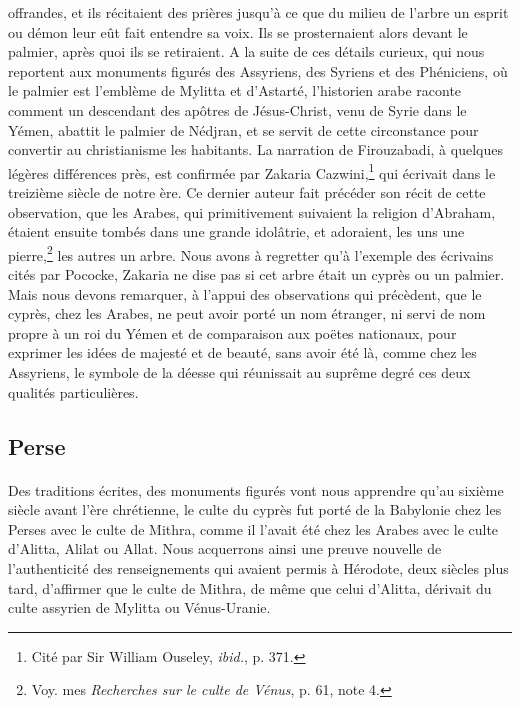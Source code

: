 \documentclass[a4paper, 11pt, oneside, polutonikogreek, french]{article}
\begin{document}
offrandes, et ils récitaient des prières jusqu'à ce que du milieu de l'arbre un esprit ou démon leur eût fait entendre sa voix. Ils se prosternaient alors devant le palmier, après quoi ils se retiraient. A la suite de ces détails curieux, qui nous reportent aux monuments figurés des Assyriens, des Syriens et des Phéniciens, où le palmier est l'emblème de Mylitta et d'Astarté, l'historien arabe raconte comment un descendant des apôtres de Jésus-Christ, venu de Syrie dans le Yémen, abattit le palmier de Nédjran, et se servit de cette circonstance pour convertir au christianisme les habitants. La narration de Firouzabadi, à quelques légères différences près, est confirmée par Zakaria Cazwini,\footnote{Cité par Sir William Ouseley, \emph{ibid.}, p. 371.} qui écrivait dans le treizième siècle de notre ère. Ce dernier auteur fait précéder son récit de cette observation, que les Arabes, qui primitivement suivaient la religion d'Abraham, étaient ensuite tombés dans une grande idolâtrie, et adoraient, les uns une pierre,\footnote{Voy. mes \emph{Recherches sur le culte de Vénus}, p. 61, note 4.} les autres un arbre. Nous avons à regretter qu'à l'exemple des écrivains cités par Pococke, Zakaria ne dise pas si cet arbre était un cyprès ou un palmier. Mais nous devons remarquer, à l'appui des observations qui précèdent, que le cyprès, chez les Arabes, ne peut avoir porté un nom étranger, ni servi de nom propre à un roi du Yémen et de comparaison aux poëtes nationaux, pour exprimer les idées de majesté et de beauté, sans avoir été là, comme chez les Assyriens, le symbole de la déesse qui réunissait au suprême degré ces deux qualités particulières.

\clearpage
\subsection{Perse}
\paragraph{}
Des traditions écrites, des monuments figurés vont nous apprendre qu'au sixième siècle avant l'ère chrétienne, le culte du cyprès fut porté de la Babylonie chez les Perses avec le culte de Mithra, comme il l'avait été chez les Arabes avec le culte d'Alitta, Alilat ou Allat. Nous acquerrons ainsi une preuve nouvelle de l'authenticité des renseignements qui avaient permis à Hérodote, deux siècles plus tard, d'affirmer que le culte de Mithra, de même que celui d'Alitta, dérivait du culte assyrien de Mylitta ou Vénus-Uranie.
\end{document}
